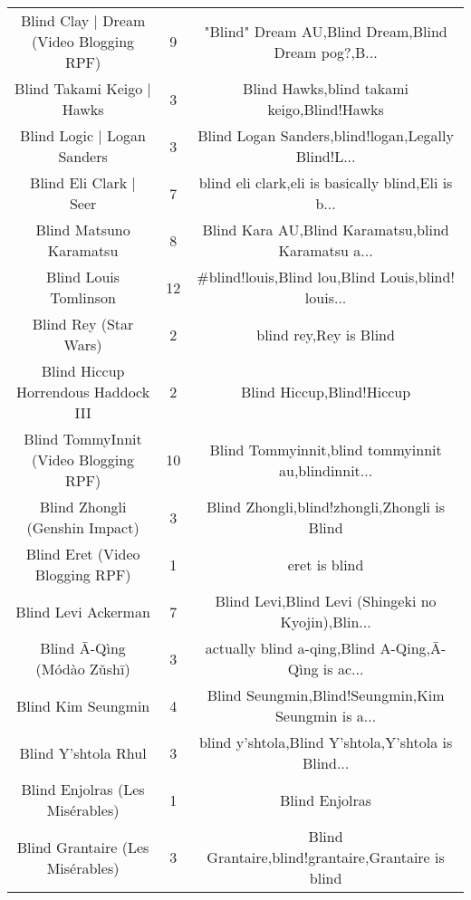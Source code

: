 \begin{table}[h!]
{\begin{tabular}{|c|c|c|}
           Blind Clay | Dream (Video Blogging RPF) &      9 & "Blind" Dream AU,Blind Dream,Blind Dream pog?,B... \\
                        Blind Takami Keigo | Hawks &      3 &         Blind Hawks,blind takami keigo,Blind!Hawks \\
                       Blind Logic | Logan Sanders &      3 & Blind Logan Sanders,blind!logan,Legally Blind!L... \\
                            Blind Eli Clark | Seer &      7 & blind eli clark,eli is basically blind,Eli is b... \\
                           Blind Matsuno Karamatsu &      8 & Blind Kara AU,Blind Karamatsu,blind Karamatsu a... \\
                             Blind Louis Tomlinson &     12 & \#blind!louis,Blind lou,Blind Louis,blind! louis... \\
                             Blind Rey (Star Wars) &      2 &                             blind rey,Rey is Blind \\
               Blind Hiccup Horrendous Haddock III &      2 &                          Blind Hiccup,Blind!Hiccup \\
             Blind TommyInnit (Video Blogging RPF) &     10 & Blind Tommyinnit,blind tommyinnit au,blindinnit... \\
                    Blind Zhongli (Genshin Impact) &      3 &       Blind Zhongli,blind!zhongli,Zhongli is Blind \\
                   Blind Eret (Video Blogging RPF) &      1 &                                      eret is blind \\
                               Blind Levi Ackerman &      7 & Blind Levi,Blind Levi (Shingeki no Kyojin),Blin... \\
                        Blind Ā-Qìng (Módào Zǔshī) &      3 & actually blind a-qing,Blind A-Qing,Ā-Qìng is ac... \\
                                Blind Kim Seungmin &      4 & Blind Seungmin,Blind!Seungmin,Kim Seungmin is a... \\
                               Blind Y'shtola Rhul &      3 & blind y'shtola,Blind Y’shtola,Y'shtola is Blind... \\
                   Blind Enjolras (Les Misérables) &      1 &                                     Blind Enjolras \\
                  Blind Grantaire (Les Misérables) &      3 & Blind Grantaire,blind!grantaire,Grantaire is blind \\

\end{tabular}}
\end{table}
